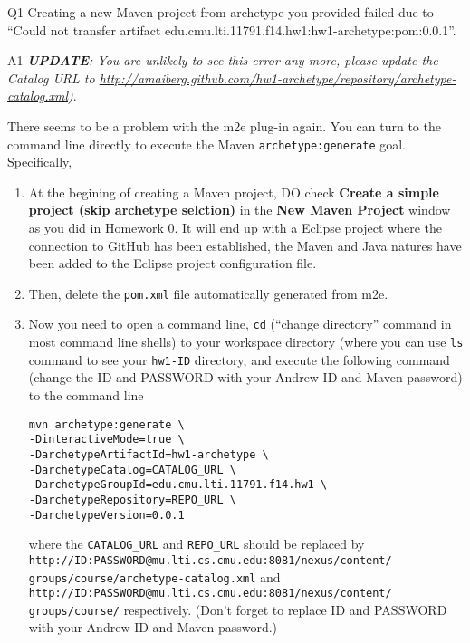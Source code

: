 \begin{qa}

\item[Q1] Creating a new Maven project from archetype you provided failed due to
``Could not transfer artifact
edu.cmu.lti.11791.f14.hw1:hw1-archetype:pom:0.0.1''.

\item[A1] \emph{\textbf{UPDATE}: You are unlikely to see this error any more,
please update the Catalog URL to
\url{http://amaiberg.github.com/hw1-archetype/repository/archetype-catalog.xml})}.

There seems to be a problem with the m2e plug-in again. You can turn to the
command line directly to execute the Maven \texttt{archetype:generate} goal.
Specifically,

\begin{enumerate}

\item At the begining of creating a Maven project, DO check
\textbf{Create a simple project (skip archetype selction)} in the \textbf{New Maven Project}
window as you did in Homework 0. It will end up with a Eclipse project where the
connection to GitHub has been established, the Maven and Java natures have been
added to the Eclipse project configuration file.

\item Then, delete the \verb|pom.xml| file automatically generated from m2e.

\item Now you need to open a command line, \verb|cd| (``change directory'' command in
most command line shells) to your workspace directory (where you can use
\verb|ls| command to see your \verb|hw1-ID| directory, and execute the following
command (change the ID and PASSWORD with your Andrew ID and Maven password) to
the command line

\small
\begin{verbatim}
mvn archetype:generate \
-DinteractiveMode=true \
-DarchetypeArtifactId=hw1-archetype \
-DarchetypeCatalog=CATALOG_URL \
-DarchetypeGroupId=edu.cmu.lti.11791.f14.hw1 \
-DarchetypeRepository=REPO_URL \
-DarchetypeVersion=0.0.1
\end{verbatim}
\normalsize

where the \verb|CATALOG_URL| and \verb|REPO_URL| should be replaced by
\verb|http://ID:PASSWORD@mu.lti.cs.cmu.edu:8081/nexus/content/|
\verb|groups/course/archetype-catalog.xml| and
\verb|http://ID:PASSWORD@mu.lti.cs.cmu.edu:8081/nexus/content/|
\verb|groups/course/| respectively. (Don't forget to replace ID and PASSWORD
with your Andrew ID and Maven password.)


\end{enumerate}
\end{qa}
